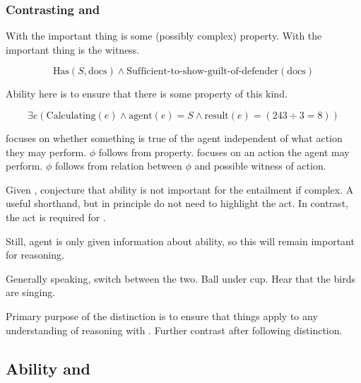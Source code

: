 \subsubsection{Contrasting \AR{} and \WR{}}
\label{sec:contrasting-ar-wr}

\begin{note}[Difference]
  With \AR{} the important thing is some (possibly complex) property.
  With \WR{} the important thing is the witness.

  \[\text{Has}(S,\text{docs}) \land \text{Sufficient-to-show-guilt-of-defender}(\text{docs})\]

  Ability here is to ensure that there is some property of this kind.

  \[\exists e(\text{Calculating}(e) \land \text{agent}(e) = S \land \text{result}(e) = (243 \div 3 = 8))\]


  \AR{} focuses on whether something is true of the agent independent of what action they may perform.
  \(\phi\) follows from property.
  \WR{} focuses on an action the agent may perform.
  \(\phi\) follows from relation between \(\phi\) and possible witness of action.
\end{note}

\begin{note}
  Given \AR{}, conjecture that ability is not important for the entailment if complex.
  A useful shorthand, but in principle do not need to highlight the act.
  In contrast, the act is required for \WR{}.

  Still, agent is only given information about ability, so this will remain important for reasoning.
\end{note}

\begin{note}
  Generally speaking, switch between the two.
  Ball under cup.
  Hear that the birds are singing.
\end{note}

\begin{note}
  Primary purpose of the distinction is to ensure that things apply to any understanding of reasoning with .
  Further contrast after following distinction.
\end{note}

\subsection{Ability \adS{} and \adC{}}
\label{sec:ability-ads-adc}

